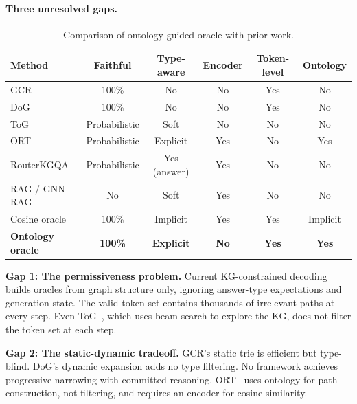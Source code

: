 \documentclass[11pt,twoside]{article}
\begin{document}
\paragraph{Three unresolved gaps.}

\begin{table}[H]
	\centering
	\caption{Comparison of ontology-guided oracle with prior work.}
	\label{tab:comparison}
	\begin{tabular}{lccccc}
		\toprule
		\textbf{Method}       & \textbf{Faithful} & \textbf{Type-aware} & \textbf{Encoder} & \textbf{Token-level} & \textbf{Ontology} \\
		\midrule
		GCR                   & 100\%             & No                & No               & Yes                  & No                \\
		DoG                   & 100\%             & No                & No               & Yes                  & No                \\
		ToG                   & Probabilistic     & Soft              & No               & No                   & No                \\
		ORT                   & Probabilistic     & Explicit          & Yes              & No                   & Yes               \\
		RouterKGQA            & Probabilistic     & Yes (answer)      & Yes              & No                   & No                \\
		RAG / GNN-RAG         & No                & Soft              & Yes              & No                   & No                \\
		Cosine oracle         & 100\%             & Implicit          & Yes              & Yes                  & Implicit          \\
		\textbf{Ontology oracle} & \textbf{100\%}    & \textbf{Explicit} & \textbf{No}      & \textbf{Yes}         & \textbf{Yes}      \\
		\bottomrule
	\end{tabular}
\end{table}

\textbf{Gap 1: The permissiveness problem.} Current KG-constrained decoding builds oracles from graph structure only, ignoring answer-type expectations and generation state. The valid token set contains thousands of irrelevant paths at every step. Even ToG~\citep{sun2024tog}, which uses beam search to explore the KG, does not filter the token set at each step.

\textbf{Gap 2: The static-dynamic tradeoff.} GCR's static trie is efficient but type-blind. DoG's dynamic expansion adds no type filtering. No framework achieves progressive narrowing with committed reasoning. ORT~\citep{ort2025} uses ontology for path construction, not filtering, and requires an encoder for cosine similarity.
\end{document}
